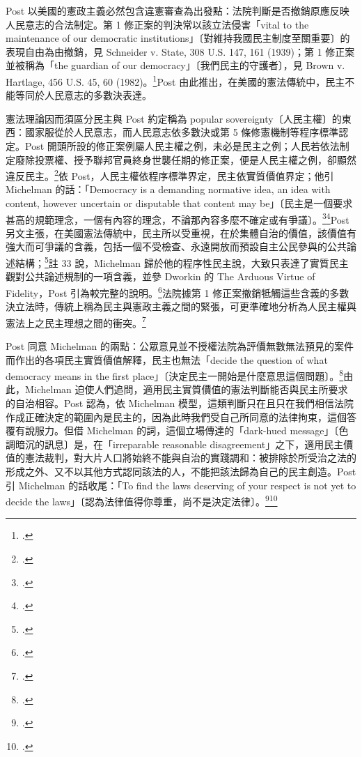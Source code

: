 Post 以美國的憲政主義必然包含違憲審查為出發點：法院判斷是否撤銷原應反映人民意志的合法制定。第 1 修正案的判決常以該立法侵害「vital to the maintenance of our democratic institutions」〔對維持我國民主制度至關重要〕的表現自由為由撤銷，見 Schneider v. State, 308 U.S. 147, 161 (1939)；第 1 修正案並被稱為「the guardian of our democracy」〔我們民主的守護者〕，見 Brown v. Hartlage, 456 U.S. 45, 60 (1982)。\footcite[437 \& nn.29--30]{post1998}Post 由此推出，在美國的憲法傳統中，民主不能等同於人民意志的多數決表達。

憲法理論因而須區分民主與 Post 約定稱為 popular sovereignty〔人民主權〕的東西：國家服從於人民意志，而人民意志依多數決或第 5 條修憲機制等程序標準認定。Post 開頭所設的修正案例屬人民主權之例，未必是民主之例；人民若依法制定廢除投票權、授予聯邦官員終身世襲任期的修正案，便是人民主權之例，卻顯然違反民主。\footcite[437]{post1998}依 Post，人民主權依程序標準界定，民主依實質價值界定；他引 Michelman 的話：「Democracy is a demanding normative idea, an idea with content, however uncertain or disputable that content may be」〔民主是一個要求甚高的規範理念，一個有內容的理念，不論那內容多麼不確定或有爭議〕。\footcite[438 \& n.31]{post1998}\footcite[419]{michelman1998}Post 另文主張，在美國憲法傳統中，民主所以受重視，在於集體自治的價值，該價值有強大而可爭議的含義，包括一個不受檢查、永遠開放而預設自主公民參與的公共論述結構；\footcite[438 \& n.32]{post1998}註 33 說，Michelman 歸於他的程序性民主說，大致只表達了實質民主觀對公共論述規制的一項含義，並參 Dworkin 的 The Arduous Virtue of Fidelity，Post 引為較完整的說明。\footcite[438 n.33]{post1998}法院據第 1 修正案撤銷牴觸這些含義的多數決立法時，傳統上稱為民主與憲政主義之間的緊張，可更準確地分析為人民主權與憲法上之民主理想之間的衝突。\footcite[438]{post1998}

Post 同意 Michelman 的兩點：公眾意見並不授權法院為評價無數無法預見的案件而作出的各項民主實質價值解釋，民主也無法「decide the question of what democracy means in the first place」〔決定民主一開始是什麼意思這個問題〕。\footcite[438 \& n.34]{post1998}由此，Michelman 迫使人們追問，適用民主實質價值的憲法判斷能否與民主所要求的自治相容。Post 認為，依 Michelman 模型，這類判斷只在且只在我們相信法院作成正確決定的範圍內是民主的，因為此時我們受自己所同意的法律拘束，這個答覆有說服力。但借 Michelman 的詞，這個立場傳達的「dark-hued message」〔色調暗沉的訊息〕是，在「irreparable reasonable disagreement」之下，適用民主價值的憲法裁判，對大片人口將始終不能與自治的實踐調和：被排除於所受治之法的形成之外、又不以其他方式認同該法的人，不能把該法歸為自己的民主創造。Post 引 Michelman 的話收尾：「To find the laws deserving of your respect is not yet to decide the laws」〔認為法律值得你尊重，尚不是決定法律〕。\footcite[438--439 \& n.35]{post1998}\footcite[427]{michelman1998}

